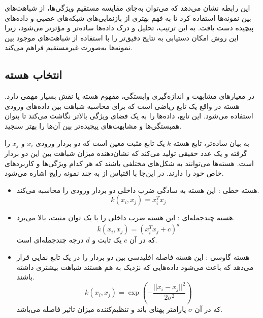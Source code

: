 این رابطه نشان می‌دهد که می‌توان به‌جای مقایسه مستقیم ویژگی‌ها، از شباهت‌های بین نمونه‌ها استفاده کرد تا به فهم بهتری از بازنمایی‌های شبکه‌های عصبی و داده‌های پیچیده دست یافت. به این ترتیب، تحلیل و درک داده‌ها ساده‌تر و مؤثرتر می‌شود، زیرا این روش امکان دستیابی به نتایج دقیق‌تر را با استفاده از شباهت‌های موجود بین نمونه‌ها به‌صورت غیرمستقیم فراهم می‌کند.




\subsection{
	انتخاب هسته%
}\label{sec_kernel_selection}
در معیارهای مشابهت و اندازه‌گیری وابستگی، مفهوم هسته یا
نقش بسیار مهمی دارد. هسته در واقع یک تابع ریاضی است که برای محاسبه شباهت بین داده‌های ورودی استفاده می‌شود. این تابع، داده‌ها را به یک فضای ویژگی بالاتر نگاشت می‌کند تا بتوان همبستگی‌ها و مشابهت‌های پیچیده‌تر بین آن‌ها را بهتر سنجید.



به بیان ساده‌تر، تابع هسته \( k \) یک تابع مثبت معین است که دو بردار ورودی \( x_i \) و \( x_j \) را گرفته و یک عدد حقیقی تولید می‌کند که نشان‌دهنده میزان شباهت بین این دو بردار است. هسته‌ها می‌توانند به شکل‌های مختلفی باشند که هر کدام ویژگی‌ها و کاربردهای خاص خود را دارند. در این‌جا با اقتباس از
\cite{kornblith2019similarity}
به چند نمونه رایج اشاره می‌شود.

\begin{itemize}
\item
هسته خطی%
:
این هسته به سادگی ضرب داخلی دو بردار ورودی را محاسبه می‌کند.
\begin{equation}
	k(x_i, x_j) = x_i^T x_j
\end{equation}
	
	
	
\item 
هسته چندجمله‌ای%
:
این هسته ضرب داخلی را با یک توان مثبت، بالا می‌برد.
\begin{equation}
	k(x_i, x_j) = (x_i^T x_j + c)^d
\end{equation}
که در آن \( c \) یک ثابت و \( d \) درجه چندجمله‌ای است.

	
\item
هسته گاوسی
%
:
این هسته فاصله اقلیدسی بین دو بردار را در یک تابع نمایی قرار می‌دهد که باعث می‌شود داده‌هایی که نزدیک به هم هستند شباهت بیشتری داشته باشند.
\begin{equation}
	k(x_i, x_j) = \exp\left(-\frac{||x_i - x_j||^2}{2\sigma^2}\right)
\end{equation}
که در آن \( \sigma \) پارامتر پهنای باند و تنظیم‌کننده میزان تاثیر فاصله می‌باشد.
\end{itemize}

